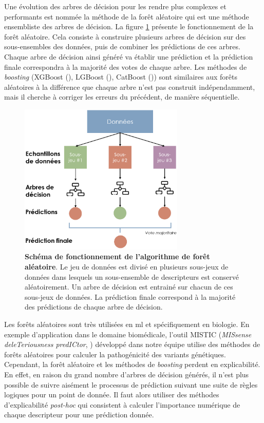 Une évolution des arbres de décision pour les rendre plus complexes et performants est nommée la méthode de la forêt aléatoire qui est une méthode ensembliste des arbres de décision. La figure \ref{fig:random-forest} présente le fonctionnement de la forêt aléatoire. Cela consiste à construire plusieurs arbres de décision sur des sous-ensembles des données, puis de combiner les prédictions de ces arbres. Chaque arbre de décision ainsi généré va établir une prédiction et la prédiction finale correspondra à la majorité des votes de chaque arbre. Les méthodes de \textit{boosting} (XGBoost (\cite{chen_xgboost_2016}), LGBoost (\cite{ke_lightgbm_2017}), CatBoost (\cite{prokhorenkova_catboost_2019})) sont similaires aux forêts aléatoires à la différence que chaque arbre n'est pas construit indépendamment, mais il cherche à corriger les erreurs du précédent, de manière séquentielle.
\begin{figure}[!htbp]
 \centering
 \includegraphics[width=0.7\textwidth]{figures/random_forest.png}
 \caption[Schéma de fonctionnement de l'algorithme de forêt aléatoire]{\textbf{Schéma de fonctionnement de l'algorithme de forêt aléatoire}. Le jeu de données est divisé en plusieurs sous-jeux de données dans lesquels un sous-ensemble de descripteurs est conservé aléatoirement. Un arbre de décision est entrainé sur chacun de ces sous-jeux de données. La prédiction finale correspond à la majorité des prédictions de chaque arbre de décision.}
 \label{fig:random-forest}
\end{figure}
Les forêts aléatoires sont très utilisées en \gls{ml} et spécifiquement en biologie. En exemple d'application dans le domaine biomédicale, l'outil MISTIC (\textit{MISsense deleTeriousness predICtor}, \cite{chennen_mistic_2020}) développé dans notre équipe utilise des méthodes de forêts aléatoires pour calculer la pathogénicité des variants génétiques. Cependant, la forêt aléatoire et les méthodes de \textit{boosting} perdent en explicabilité. En effet, en raison du grand nombre d'arbres de décision générés, il n'est plus possible de suivre aisément le processus de prédiction suivant une suite de règles logiques pour un point de donnée. Il faut alors utiliser des méthodes d'explicabilité \textit{post-hoc} qui consistent à calculer l'importance numérique de chaque descripteur pour une prédiction donnée.

